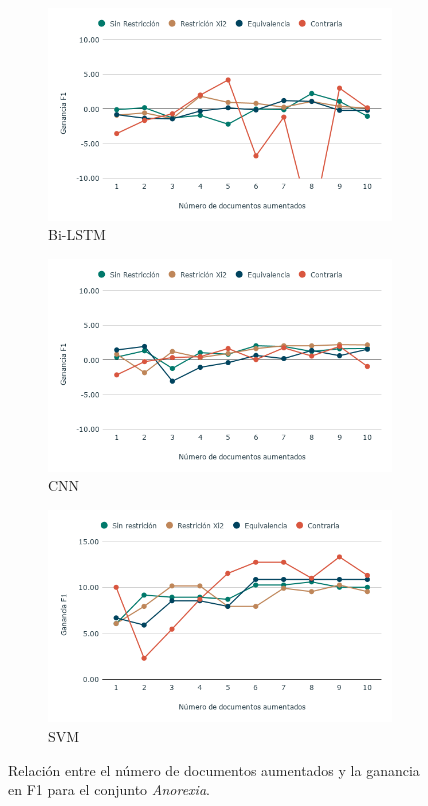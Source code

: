 \begin{figure}[hbt!]
    \centering
    \begin{subfigure}[b]{0.6\textwidth}
        \includegraphics[width=\textwidth]{sections/figures/Bi-LSTM-anox.png}
        \caption{Bi-LSTM}
    \end{subfigure}
    \hfill
    
    \begin{subfigure}[b]{0.6\textwidth}
        \includegraphics[width=\textwidth]{sections/figures/CNN_anox.png}
        \caption{CNN}
    \end{subfigure}

    
    \begin{subfigure}[b]{0.6\textwidth}
        \includegraphics[width=\textwidth]{sections/figures/SVM-anorexia.png}
        \caption{SVM}
    \end{subfigure}
    
    \caption{Relación entre el número de documentos aumentados y la ganancia en F1 para el conjunto \textit{Anorexia}.}
    \label{fig:aumento_n_anorexia}
\end{figure}